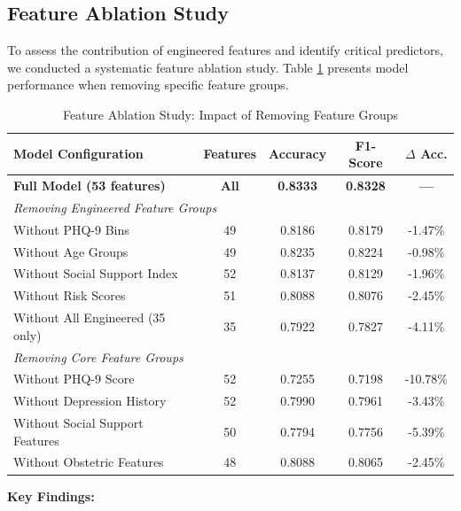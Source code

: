 \subsection{Feature Ablation Study}

To assess the contribution of engineered features and identify critical predictors, we conducted a systematic feature ablation study. Table \ref{tab:feature_ablation} presents model performance when removing specific feature groups.

\begin{table}[htbp]
\centering
\caption{Feature Ablation Study: Impact of Removing Feature Groups}
\label{tab:feature_ablation}
\begin{tabular}{lcccc}
\toprule
\textbf{Model Configuration} & \textbf{Features} & \textbf{Accuracy} & \textbf{F1-Score} & \textbf{$\Delta$ Acc.} \\
\midrule
\textbf{Full Model (53 features)} & \textbf{All} & \textbf{0.8333} & \textbf{0.8328} & \textbf{—} \\
\midrule
\multicolumn{5}{l}{\textit{Removing Engineered Feature Groups}} \\
\midrule
Without PHQ-9 Bins & 49 & 0.8186 & 0.8179 & -1.47\% \\
Without Age Groups & 49 & 0.8235 & 0.8224 & -0.98\% \\
Without Social Support Index & 52 & 0.8137 & 0.8129 & -1.96\% \\
Without Risk Scores & 51 & 0.8088 & 0.8076 & -2.45\% \\
Without All Engineered (35 only) & 35 & 0.7922 & 0.7827 & -4.11\% \\
\midrule
\multicolumn{5}{l}{\textit{Removing Core Feature Groups}} \\
\midrule
Without PHQ-9 Score & 52 & 0.7255 & 0.7198 & -10.78\% \\
Without Depression History & 52 & 0.7990 & 0.7961 & -3.43\% \\
Without Social Support Features & 50 & 0.7794 & 0.7756 & -5.39\% \\
Without Obstetric Features & 48 & 0.8088 & 0.8065 & -2.45\% \\
\bottomrule
\end{tabular}
\end{table}

\textbf{Key Findings:}

